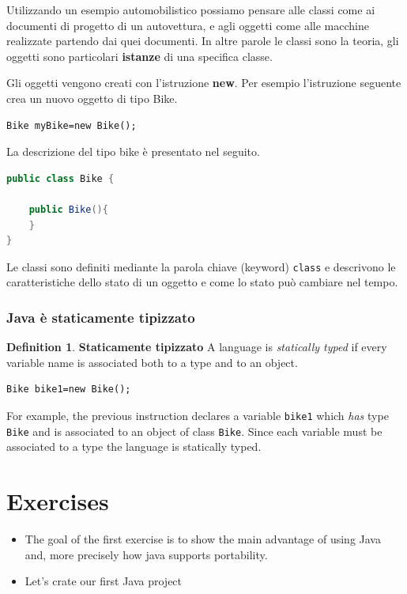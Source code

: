 \documentclass{article}
\theoremstyle{definition}
\newtheorem{mydef}{Definition}
\begin{document}
Utilizzando un esempio automobilistico possiamo pensare alle classi come ai documenti di progetto di un autovettura, e agli oggetti come alle macchine realizzate partendo dai quei documenti. In altre parole le classi sono la teoria, gli oggetti sono particolari \textbf{istanze} di una specifica classe. 

Gli oggetti vengono creati con l'istruzione \textbf{new}. Per esempio l'istruzione seguente crea un nuovo oggetto di tipo Bike. 
\begin{lstlisting}
Bike myBike=new Bike();
\end{lstlisting}
La descrizione del tipo bike \`e presentato nel seguito.
\begin{lstlisting}[language=Java,escapechar=|]
public class Bike {

	public Bike(){
	}
}
\end{lstlisting}
Le classi sono definiti mediante la parola chiave (keyword) \texttt{class} e descrivono le caratteristiche dello stato di un oggetto e come lo stato pu\`o cambiare nel tempo.


\subsubsection{Java \`e staticamente tipizzato}
\begin{mydef} \textbf{Staticamente tipizzato} A language is \emph{statically typed} if every variable name is associated both
to a type and to an object.
\end{mydef}
\begin{lstlisting}
Bike bike1=new Bike();
\end{lstlisting}
For example, the previous instruction declares a variable \texttt{bike1} which \emph{has} type \texttt{Bike} and is associated to an object of class \texttt{Bike}. Since each variable must be associated to a type the language is statically typed.

\section{Exercises}
\begin{itemize}
\item The goal of the first exercise is to show the main advantage of using Java and, more precisely how java supports portability.
\item Let's crate our first Java project
\end{itemize}
\end{document}
